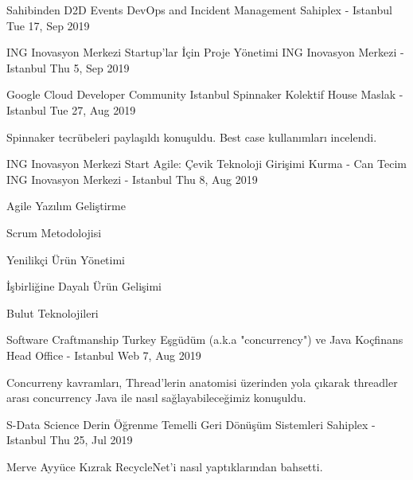 \begin{cventries}
    \cventry
    {Sahibinden D2D Events}
    {DevOps and Incident Management}
    {Sahiplex - Istanbul}
    {Tue 17, Sep 2019}
    {
      \begin{cvitems}
        \item{}
      \end{cvitems}
    }
    \cventry
    {ING Inovasyon Merkezi}
    {Startup'lar İçin Proje Yönetimi}
    {ING Inovasyon Merkezi - Istanbul}
    {Thu 5, Sep 2019}
    {
      \begin{cvitems}
      \end{cvitems}
    }
    \cventry
    {Google Cloud Developer Community Istanbul}
    {Spinnaker}
    {Kolektif House Maslak - Istanbul}
    {Tue 27, Aug 2019}
    {
      \begin{cvitems}
        \item{Spinnaker tecrübeleri paylaşıldı konuşuldu. Best case kullanımları incelendi.}
      \end{cvitems}
    }
    \cventry
    {ING Inovasyon Merkezi}
    {Start Agile: Çevik Teknoloji Girişimi Kurma - Can Tecim}
    {ING Inovasyon Merkezi - Istanbul}
    {Thu 8, Aug 2019}
    {
      \begin{cvitems}
        \item{Agile Yazılım Geliştirme}
        \item{Scrum Metodolojisi}
        \item{Yenilikçi Ürün Yönetimi}
        \item{İşbirliğine Dayalı Ürün Gelişimi}
        \item{Bulut Teknolojileri}
      \end{cvitems}
    }
    \cventry
    {Software Craftmanship Turkey}
    {Eşgüdüm (a.k.a "concurrency") ve Java}
    {Koçfinans Head Office - Istanbul}
    {Web 7, Aug 2019}
    {
      \begin{cvitems}
        \item{Concurreny kavramları, Thread'lerin anatomisi üzerinden yola çıkarak threadler arası concurrency Java ile nasıl sağlayabileceğimiz konuşuldu.}
      \end{cvitems}
    }
    \cventry
    {S-Data Science}
    {Derin Öğrenme Temelli Geri Dönüşüm Sistemleri}
    {Sahiplex - Istanbul}
    {Thu 25, Jul 2019}
    {
      \begin{cvitems}
        \item{Merve Ayyüce Kızrak RecycleNet'i nasıl yaptıklarından bahsetti.}
      \end{cvitems}
}
\end{cventries}
